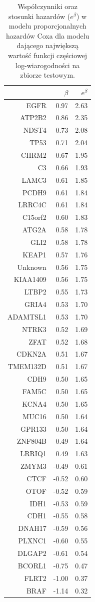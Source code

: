 \begin{table}[ht]
\centering
\begin{tabular}{rrr}
  \toprule
 & $\beta$ & $e^{\beta}$ \\ 
  \toprule
EGFR & 0.97 & 2.63 \\ 
  ATP2B2 & 0.86 & 2.35 \\ 
  NDST4 & 0.73 & 2.08 \\ 
  TP53 & 0.71 & 2.04 \\ 
  CHRM2 & 0.67 & 1.95 \\ 
  C3 & 0.66 & 1.93 \\ 
  LAMC3 & 0.61 & 1.85 \\ 
  PCDH9 & 0.61 & 1.84 \\ 
  LRRC4C & 0.61 & 1.84 \\ 
  C15orf2 & 0.60 & 1.83 \\ 
  ATG2A & 0.58 & 1.78 \\ 
  GLI2 & 0.58 & 1.78 \\ 
  KEAP1 & 0.57 & 1.76 \\ 
  Unknown & 0.56 & 1.75 \\ 
  KIAA1409 & 0.56 & 1.75 \\ 
  LTBP2 & 0.55 & 1.73 \\ 
  GRIA4 & 0.53 & 1.70 \\ 
  ADAMTSL1 & 0.53 & 1.70 \\ 
  NTRK3 & 0.52 & 1.69 \\ 
  ZFAT & 0.52 & 1.68 \\ 
  CDKN2A & 0.51 & 1.67 \\ 
  TMEM132D & 0.51 & 1.67 \\ 
  CDH9 & 0.50 & 1.65 \\ 
  FAM5C & 0.50 & 1.65 \\ 
  KCNA4 & 0.50 & 1.65 \\ 
  MUC16 & 0.50 & 1.64 \\ 
  GPR133 & 0.50 & 1.64 \\ 
  ZNF804B & 0.49 & 1.64 \\ 
  LRRIQ1 & 0.49 & 1.63 \\ 
  ZMYM3 & -0.49 & 0.61 \\ 
  CTCF & -0.52 & 0.60 \\ 
  OTOF & -0.52 & 0.59 \\ 
  IDH1 & -0.53 & 0.59 \\ 
  CDH1 & -0.55 & 0.58 \\ 
  DNAH17 & -0.59 & 0.56 \\ 
  PLXNC1 & -0.60 & 0.55 \\ 
  DLGAP2 & -0.61 & 0.54 \\ 
  BCORL1 & -0.75 & 0.47 \\ 
  FLRT2 & -1.00 & 0.37 \\ 
  BRAF & -1.14 & 0.32 \\ 
   \bottomrule
\end{tabular}
\caption{\label{tabelka}Współczynniki oraz stosunki hazardów ($e^{\beta}$) w modelu proporcjonalnych hazardów Coxa dla modelu dającego największą wartość funkcji częściowej log-wiarogodności na zbiorze testowym. }
\end{table}
